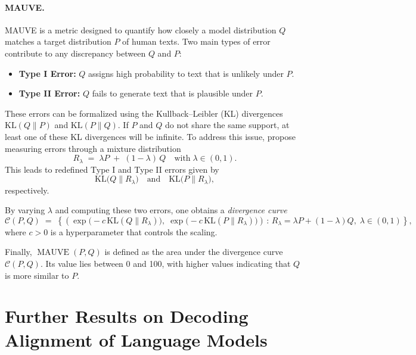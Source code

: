 \documentclass{article}
\theoremstyle{plain}
\theoremstyle{definition}
\theoremstyle{remark}
\begin{document}
\paragraph{MAUVE.} MAUVE \cite{pillutla2021mauvemeasuringgapneural} is a metric designed to quantify how closely a model distribution \(Q\) matches a target distribution \(P\) of human texts. Two main types of error contribute to any discrepancy between \(Q\) and \(P\): 
\begin{itemize}
    \item \textbf{Type I Error:} \(Q\) assigns high probability to text that is unlikely under \(P\).
    \item \textbf{Type II Error:} \(Q\) fails to generate text that is plausible under \(P\).
\end{itemize}

\noindent
These errors can be formalized using the Kullback--Leibler (KL) divergences \(\mathrm{KL}(Q \!\parallel\! P)\) and \(\mathrm{KL}(P \!\parallel\! Q)\). If \(P\) and \(Q\) do not share the same support, at least one of these KL divergences will be infinite. To address this issue, \citet{pillutla2021mauvemeasuringgapneural} propose measuring errors through a mixture distribution
\[
R_{\lambda} \;=\; \lambda P \;+\; (1-\lambda)\,Q
\quad\text{with}\;\lambda \in (0,1).
\]
This leads to redefined Type I and Type II errors given by
\[
\mathrm{KL}\!\bigl(Q \!\parallel\! R_{\lambda}\bigr)
\quad \text{and} \quad
\mathrm{KL}\!\bigl(P \!\parallel\! R_{\lambda}\bigr),
\]
respectively.

\bigskip
\noindent
By varying \(\lambda\) and computing these two errors, one obtains a \emph{divergence curve}
\[
\mathcal{C}(P, Q)
\;=\;
\left\{
\left(
\exp\!\bigl(-c\,\mathrm{KL}(Q \!\parallel\! R_{\lambda})\bigr),\;
\exp\!\bigl(-c\,\mathrm{KL}(P \!\parallel\! R_{\lambda})\bigr)
\right)
\,:\,
R_\lambda = \lambda P + (1-\lambda) Q,\;
\lambda \in (0,1)
\right\},
\]
where \(c > 0\) is a hyperparameter that controls the scaling.

\bigskip
\noindent
Finally, \(\operatorname{MAUVE}(P, Q)\) is defined as the area under the divergence curve \(\mathcal{C}(P, Q)\). Its value lies between 0 and 100, with higher values indicating that \(Q\) is more similar to \(P\).



\section{Further Results on Decoding Alignment of Language Models}\label{app:further-results}
\end{document}
